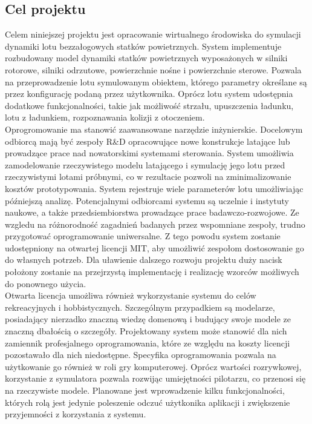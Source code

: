 \documentclass[15pt]{sprawozdanie}
\begin{document}
\subsection{Cel projektu}

Celem niniejszej projektu jest opracowanie wirtualnego środowiska do symulacji dynamiki lotu bezzałogowych statków powietrznych. System implementuje rozbudowany model dynamiki statków powietrznych wyposażonych w silniki rotorowe, silniki odrzutowe, powierzchnie nośne i powierzchnie sterowe. Pozwala na przeprowadzenie lotu symulowanym obiektem, którego parametry określane są przez konfigurację podaną przez użytkownika. Oprócz lotu system udostępnia dodatkowe funkcjonalności, takie jak możliwość strzału, upuszczenia ładunku, lotu z ładunkiem, rozpoznawania kolizji z otoczeniem.\\

Oprogromowanie ma stanowić zaawansowane narzędzie inżynierskie. Docelowym odbiorcą mają być zespoły R\&D opracowujące nowe konstrukcje latające lub prowadzące prace nad nowatorskimi systemami sterowania. System umożliwia zamodelowanie rzeczywistego modelu latającego i symulację jego lotu przed rzeczywistymi lotami próbnymi, co w rezultacie pozwoli na zminimalizowanie kosztów prototypowania. System rejestruje wiele parameterów lotu umożliwiając późniejszą analizę. Potencjalnymi odbiorcami systemu są uczelnie i instytuty naukowe, a także przedsiembiorstwa prowadzące prace badawczo-rozwojowe. Ze wzgledu na różnorodność zagadnień badanych przez wspomniane zespoły, trudno przygotować oprogramowanie uniwersalne. Z tego powodu system zostanie udostępniony na otwartej licencji MIT, aby umożliwić zespołom dostosowanie go do własnych potrzeb. Dla uławienie dalszego rozwoju projektu duży nacisk położony zostanie na przejrzystą implementację i realizację wzorców możliwych do ponownego użycia.\\

Otwarta licencja umożliwa również wykorzystanie systemu do celów rekreacyjnych i hobbistycznych. Szczególnym przypadkiem są modelarze, posiadający nierzadko znaczną wiedzę domenową i budujący swoje modele ze znaczną dbałością o szczegóły. Projektowany system może stanowić dla nich zamiennik profesjalnego oprogramowania, które ze względu na koszty licencji pozostawało dla nich niedostępne. Specyfika oprogramowania pozwala na użytkowanie go również w roli gry komputerowej. Oprócz wartości rozrywkowej, korzystanie z symulatora pozwala rozwijąc umiejętności pilotarzu, co przenosi się na rzeczywiste modele. Planowane jest wprowadzenie kilku funkcjonalności, których rolą jest jedynie poleszenie odczuć użytkonika aplikacji i zwiększenie przyjemności z korzystania z systemu.\\
\end{document}
